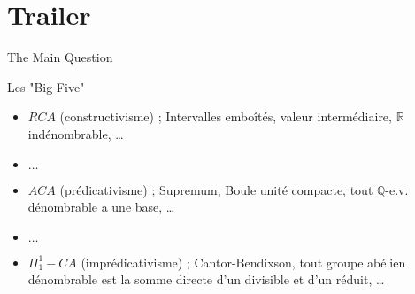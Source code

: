 \documentclass{beamer} %
\newcommand{\Q}{\mathbb{Q}}
\begin{document}
\section{Trailer}

\begin{frame}{The Main Question}
    \begin{block}{Les "Big Five"}
        \begin{itemize}
            \item<4-> $RCA$ (constructivisme) ; Intervalles emboîtés, valeur intermédiaire, $\mathbb{R}$ indénombrable, \dots
            \item<5-> $\dots$
            \item<2-> $ACA$ (prédicativisme) ; Supremum, Boule unité compacte, tout $\Q$-e.v. dénombrable a une base, \dots
            \item<5-> $\dots$
            \item<3-> $\Pi_1^1-CA$ (imprédicativisme) ; Cantor-Bendixson, tout groupe abélien dénombrable est la somme directe d'un divisible et d'un réduit, \dots 
        \end{itemize}
    \end{block}
\end{frame}
\end{document}
